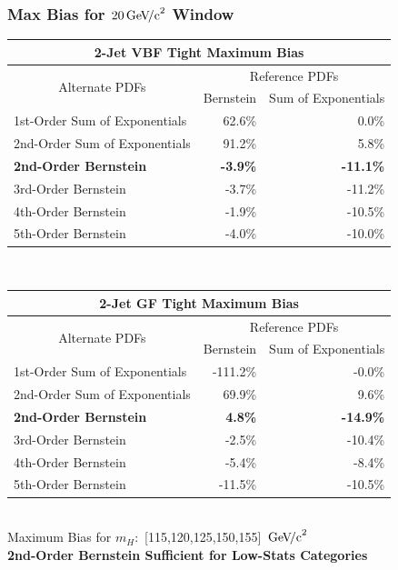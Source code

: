 \documentclass{beamer}
\newcommand{\GeVcc}{\ensuremath{\,\mathrm{Ge\kern -0.1em V\!/c}^2}}
\begin{document}
\begin{frame}
\frametitle{Max Bias for $20\GeVcc{}$ Window}
\tiny
\begin{center}
\begin{tabular}{|l|r|r|} \hline 
\multicolumn{3}{|c|}{ \bf 2-Jet VBF Tight Maximum Bias} \\ \hline
\multicolumn{1}{|c|}{\multirow{2}{*}{Alternate PDFs}} & \multicolumn{2}{c|}{Reference PDFs} \\ \cline{2-3} 
& \multicolumn{1}{c|}{      Bernstein}  & \multicolumn{1}{c|}{Sum of Exponentials}  \\ \hline
1st-Order Sum of Exponentials &           62.6\%  &            0.0\%  \\ \hline
2nd-Order Sum of Exponentials &           91.2\%  &            5.8\%  \\ \hline
\bf 2nd-Order Bernstein &   \bf         -3.9\%  &    \bf       -11.1\%  \\ \hline
3rd-Order Bernstein &           -3.7\%  &          -11.2\%  \\ \hline
4th-Order Bernstein &           -1.9\%  &          -10.5\%  \\ \hline
5th-Order Bernstein &           -4.0\%  &          -10.0\%  \\ \hline
\end{tabular}
\\ \vspace{1em}
\begin{tabular}{|l|r|r|} \hline 
\multicolumn{3}{|c|}{ \bf 2-Jet GF Tight Maximum Bias} \\ \hline
\multicolumn{1}{|c|}{\multirow{2}{*}{Alternate PDFs}} & \multicolumn{2}{c|}{Reference PDFs} \\ \cline{2-3} 
& \multicolumn{1}{c|}{      Bernstein}  & \multicolumn{1}{c|}{Sum of Exponentials}  \\ \hline
1st-Order Sum of Exponentials &         -111.2\%  &           -0.0\%  \\ \hline
2nd-Order Sum of Exponentials &           69.9\%  &            9.6\%  \\ \hline
\bf 2nd-Order Bernstein &    \bf         4.8\%  &   \bf        -14.9\%  \\ \hline
3rd-Order Bernstein &           -2.5\%  &          -10.4\%  \\ \hline
4th-Order Bernstein &           -5.4\%  &           -8.4\%  \\ \hline
5th-Order Bernstein &          -11.5\%  &          -10.5\%  \\ \hline
\end{tabular}
\\ \vspace{1em}
\scriptsize
Maximum Bias for $m_H:$ [115,120,125,150,155] \GeVcc{}
\\
\small
\bf
2nd-Order Bernstein Sufficient for Low-Stats Categories
\end{center}
\end{frame}
\end{document}
